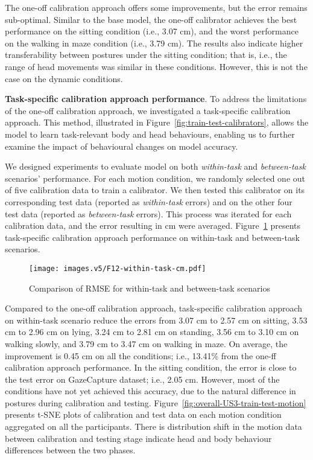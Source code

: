 The one-off calibration approach offers some improvements, but the error remains sub-optimal. Similar to the base model, the one-off calibrator achieves the best performance on the sitting condition (i.e., 3.07 cm), and the worst performance on the walking in maze condition (i.e., 3.79 cm). The results also indicate higher transferability between postures under the sitting condition; that is, i.e., the range of head movements was similar in these conditions. However, this is not the case on the dynamic conditions. 


\noindent\textbf{Task-specific calibration approach performance}. 
To address the limitations of the one-off calibration approach, we investigated a task-specific calibration approach. This method, illustrated in Figure~\ref{fig:train-test-calibrators}, allows the model to learn task-relevant body and head behaviours, enabling us to further examine the impact of behavioural changes on model accuracy.

We designed experiments to evaluate model on both \textit{within-task} and \textit{between-task} scenarios' performance. For each motion condition, we randomly selected one out of five calibration data to train a calibrator. We then tested this calibrator on its corresponding test data (reported as \textit{within-task} errors) and on the other four test data (reported as \textit{between-task} errors). This process was iterated for each calibration data, and the error resulting in cm were averaged. Figure~\ref{fig:within-between} presents task-specific calibration approach performance on within-task and between-task scenarios.


\begin{figure}[!htbp]
    \centering
    \texttt{[image: images.v5/F12-within-task-cm.pdf]}
    \caption{Comparison of RMSE for within-task and between-task scenarios}
    \label{fig:within-between}
\end{figure}

Compared to the one-off calibration approach, task-specific calibration approach on within-task scenario reduce the errors from 3.07 cm to 2.57 cm on sitting, 3.53 cm to 2.96 cm on lying, 3.24 cm to 2.81 cm on standing, 3.56 cm to 3.10 cm on walking slowly, and 3.79 cm to 3.47 cm on walking in maze. On average, the improvement is 0.45 cm on all the conditions; i.e., 13.41\% from the one-ff calibration approach performance. In the sitting condition, the error is close to the test error on GazeCapture dataset; i.e., 2.05 cm. However, most of the conditions have not yet achieved this accuracy, due to the natural difference in postures during calibration and testing. Figure~\ref{fig:overall-US3-train-test-motion} presents t-SNE plots of calibration and test data on each motion condition aggregated on all the participants. There is distribution shift in the motion data between calibration and testing stage indicate head and body behaviour differences between the two phases.

